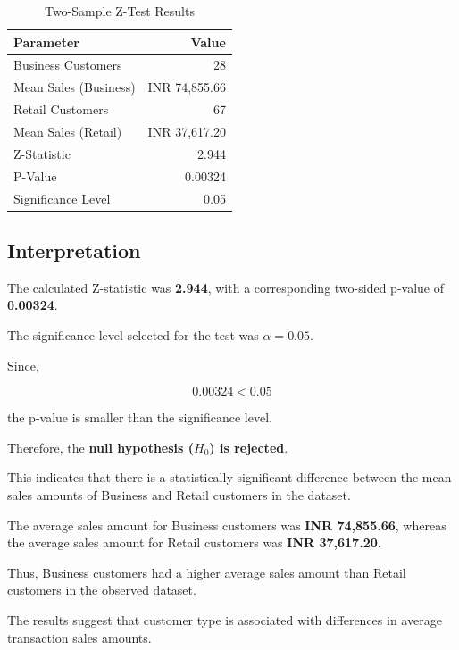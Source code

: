 \documentclass[12pt,a4paper]{report}
\begin{document}
\begin{table}[H]
\centering
\renewcommand{\arraystretch}{1.4}

\begin{tabular}{|l|r|}
\hline
\textbf{Parameter} & \textbf{Value} \\
\hline
Business Customers & 28 \\
\hline
Mean Sales (Business) & INR 74,855.66 \\
\hline
Retail Customers & 67 \\
\hline
Mean Sales (Retail) & INR 37,617.20 \\
\hline
Z-Statistic & 2.944 \\
\hline
P-Value & 0.00324 \\
\hline
Significance Level & 0.05 \\
\hline
\end{tabular}

\caption{Two-Sample Z-Test Results}
\label{tab:ztest_results}

\end{table}


\subsection{Interpretation}

The calculated Z-statistic was
\textbf{2.944}, with a corresponding
two-sided p-value of
\textbf{0.00324}.

The significance level selected
for the test was
$\alpha = 0.05$.

Since,

\[
0.00324 < 0.05
\]

the p-value is smaller than
the significance level.

Therefore, the
\textbf{null hypothesis ($H_0$)
is rejected}.

This indicates that there is
a statistically significant
difference between the mean
sales amounts of Business and
Retail customers in the dataset.

The average sales amount for
Business customers was
\textbf{INR 74,855.66},
whereas the average sales amount
for Retail customers was
\textbf{INR 37,617.20}.

Thus, Business customers had
a higher average sales amount
than Retail customers in
the observed dataset.

The results suggest that
customer type is associated
with differences in average
transaction sales amounts.
\end{document}

